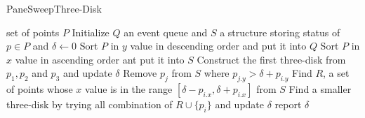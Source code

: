 \begin{algorithm}[h]
  \caption{PaneSweepThree-Disk}
  \label{alg:panesweep}
  \begin{algorithmic}
      \Require set of points $P$
      \State Initialize $Q$ an event queue and $S$ a structure storing status of $p \in P$ and $\delta \leftarrow 0$
      \State Sort $P$ in $y$ value in descending order and put it into $Q$
      \State Sort $P$ in $x$ value in ascending order ant put it into $S$
      \State Construct the first three-disk from $p_1, p_2$ and $p_3$ and update $\delta$
	\State Remove $p_j$ from $S$ where  $ p_{j.y} > \delta + p_{i.y} $
	\State Find $R$, a set of points whose $x$ value is in the range  $[ \delta - p_{i.x}, \delta + p_{i.x} ]$ from $S$
	\State Find a smaller three-disk by trying all combination of $R \cup \{p_i\}$ and update $\delta$
	\EndIf
      \EndFor
      \State report $\delta$
\end{algorithmic}
\end{algorithm}

